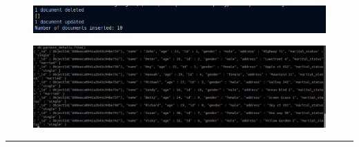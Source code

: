 \documentclass[12pt,letterpaper]{article}
\begin{document}
\subsection*{}
\subsubsection*{{}}
\begin{flushleft}
    
\end{flushleft}

\newpage
\subsection*{}
\begin{figure}[h]
    \centering
    \includegraphics[width = \textwidth]{MongoDB/op1.png}
\end{figure}
\begin{figure}[h]
    \centering
    \includegraphics[width = \textwidth]{MongoDB/op2.png}
\end{figure}

\hrule
\end{document}
